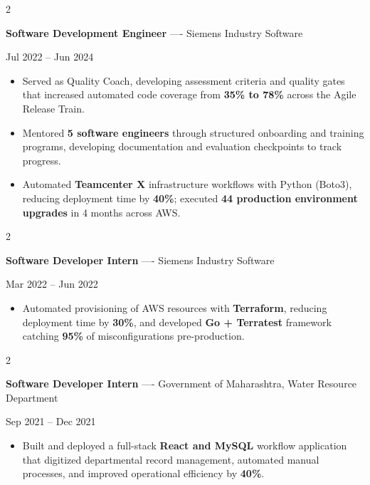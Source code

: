 \documentclass[10pt, letterpaper]{article}
\newenvironment{highlights}{
    \begin{itemize}[
        topsep=0.10 cm,
        parsep=0.06 cm,
        partopsep=0pt,
        itemsep=0.06 cm,
        leftmargin=12pt
    ]
}{
    \end{itemize}
}
\newenvironment{twocolentry}[2][]{
    \onecolentry
    \def\secondColumn{#2}
    \setcolumnwidth{\fill, 4.5 cm}
    \begin{paracol}{2}
}{
    \switchcolumn \raggedleft \secondColumn
    \end{paracol}
    \endonecolentry
}
\begin{document}
\vspace{0.15 cm}

\begin{twocolentry}{Jul 2022 -- Jun 2024}
\textbf{Software Development Engineer} ---- Siemens Industry Software
\end{twocolentry}
\begin{highlights}
  \item Served as Quality Coach, developing assessment criteria and quality gates that increased automated code coverage from \textbf{35\% to 78\%} across the Agile Release Train.
  \item Mentored \textbf{5 software engineers} through structured onboarding and training programs, developing documentation and evaluation checkpoints to track progress.
  \item Automated \textbf{Teamcenter X} infrastructure workflows with Python (Boto3), reducing deployment time by \textbf{40\%}; executed \textbf{44 production environment upgrades} in 4 months across AWS.
\end{highlights}

\vspace{0.15 cm}

\begin{twocolentry}{Mar 2022 -- Jun 2022}
\textbf{Software Developer Intern} ---- Siemens Industry Software
\end{twocolentry}
\begin{highlights}
  \item Automated provisioning of AWS resources with \textbf{Terraform}, reducing deployment time by \textbf{30\%}, and developed \textbf{Go + Terratest} framework catching \textbf{95\%} of misconfigurations pre-production.
\end{highlights}

\vspace{0.15 cm}

\begin{twocolentry}{Sep 2021 -- Dec 2021}
\textbf{Software Developer Intern} ---- Government of Maharashtra, Water Resource Department
\end{twocolentry}
\begin{highlights}
  \item Built and deployed a full-stack \textbf{React and MySQL} workflow application that digitized departmental record management, automated manual processes, and improved operational efficiency by \textbf{40\%}.
\end{highlights}
\end{document}

